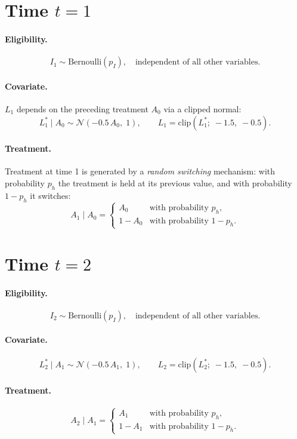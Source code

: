 \documentclass[12pt]{article}
\begin{document}
\section{Time $t = 1$}

\paragraph{Eligibility.}
\[
  I_1 \sim \mathrm{Bernoulli}(p_I), \quad \text{independent of all other variables.}
\]

\paragraph{Covariate.}
$L_1$ depends on the preceding treatment $A_0$ via a clipped normal:
\[
  L_1^* \mid A_0 \sim \mathcal{N}(-0.5\, A_0,\; 1),
  \qquad
  L_1 = \mathrm{clip}(L_1^*;\; -1.5,\; -0.5).
\]

\paragraph{Treatment.}
Treatment at time 1 is generated by a \emph{random switching} mechanism: with
probability $p_h$ the treatment is held at its previous value, and with
probability $1-p_h$ it switches:
\[
  A_1 \mid A_0 =
  \begin{cases}
    A_0     & \text{with probability } p_h, \\
    1 - A_0 & \text{with probability } 1 - p_h.
  \end{cases}
\]

\section{Time $t = 2$}

\paragraph{Eligibility.}
\[
  I_2 \sim \mathrm{Bernoulli}(p_I), \quad \text{independent of all other variables.}
\]

\paragraph{Covariate.}
\[
  L_2^* \mid A_1 \sim \mathcal{N}(-0.5\, A_1,\; 1),
  \qquad
  L_2 = \mathrm{clip}(L_2^*;\; -1.5,\; -0.5).
\]

\paragraph{Treatment.}
\[
  A_2 \mid A_1 =
  \begin{cases}
    A_1     & \text{with probability } p_h, \\
    1 - A_1 & \text{with probability } 1 - p_h.
  \end{cases}
\]
\end{document}
